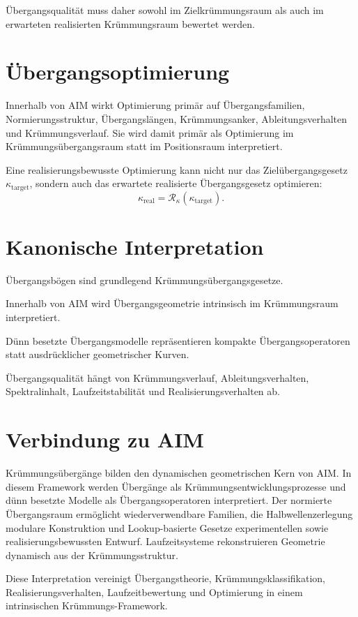 Übergangsqualität muss daher sowohl im Zielkrümmungsraum als auch im erwarteten
realisierten Krümmungsraum bewertet werden.

\section{Übergangsoptimierung}

Innerhalb von AIM wirkt Optimierung primär auf Übergangsfamilien,
Normierungsstruktur, Übergangslängen, Krümmungsanker,
Ableitungsverhalten und Krümmungsverlauf. Sie wird damit primär als
Optimierung im Krümmungsübergangsraum statt im Positionsraum interpretiert.

Eine realisierungsbewusste Optimierung kann nicht nur das
Zielübergangsgesetz \(\kappa_{\mathrm{target}}\), sondern auch das erwartete
realisierte Übergangsgesetz optimieren:
\[
\kappa_{\mathrm{real}}
=
\mathcal R_{\kappa}(\kappa_{\mathrm{target}}).
\]

\section{Kanonische Interpretation}

\begin{proposition}
Übergangsbögen sind grundlegend Krümmungsübergangsgesetze.
\end{proposition}
\begin{proposition}
Innerhalb von AIM wird Übergangsgeometrie intrinsisch im Krümmungsraum
interpretiert.
\end{proposition}
\begin{proposition}
Dünn besetzte Übergangsmodelle repräsentieren kompakte Übergangsoperatoren
statt ausdrücklicher geometrischer Kurven.
\end{proposition}
\begin{proposition}
Übergangsqualität hängt von Krümmungsverlauf, Ableitungsverhalten,
Spektralinhalt, Laufzeitstabilität und Realisierungsverhalten ab.
\end{proposition}

\section{Verbindung zu AIM}

\begin{summary}
Krümmungsübergänge bilden den dynamischen geometrischen Kern von AIM. In
diesem Framework werden Übergänge als Krümmungsentwicklungsprozesse und dünn
besetzte Modelle als Übergangsoperatoren interpretiert. Der normierte
Übergangsraum ermöglicht wiederverwendbare Familien, die
Halbwellenzerlegung modulare Konstruktion und Lookup-basierte Gesetze
experimentellen sowie realisierungsbewussten Entwurf. Laufzeitsysteme
rekonstruieren Geometrie dynamisch aus der Krümmungsstruktur.

Diese Interpretation vereinigt Übergangstheorie, Krümmungsklassifikation,
Realisierungsverhalten, Laufzeitbewertung und Optimierung in einem
intrinsischen Krümmungs-Framework.
\end{summary}
